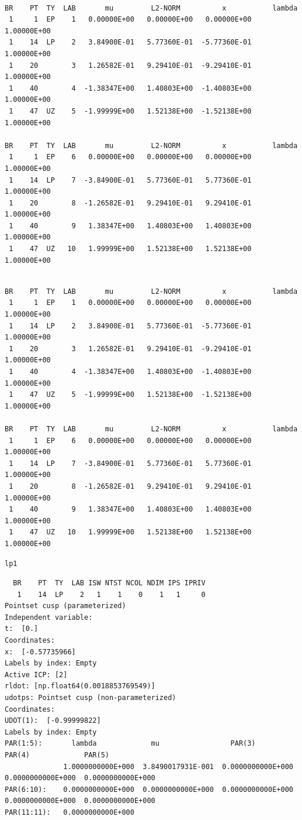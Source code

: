 \documentclass[11pt]{article}
\begin{document}
\begin{verbatim}

BR    PT  TY  LAB       mu         L2-NORM          x           lambda    
 1     1  EP    1   0.00000E+00   0.00000E+00   0.00000E+00   1.00000E+00
 1    14  LP    2   3.84900E-01   5.77360E-01  -5.77360E-01   1.00000E+00
 1    20        3   1.26582E-01   9.29410E-01  -9.29410E-01   1.00000E+00
 1    40        4  -1.38347E+00   1.40803E+00  -1.40803E+00   1.00000E+00
 1    47  UZ    5  -1.99999E+00   1.52138E+00  -1.52138E+00   1.00000E+00

BR    PT  TY  LAB       mu         L2-NORM          x           lambda    
 1     1  EP    6   0.00000E+00   0.00000E+00   0.00000E+00   1.00000E+00
 1    14  LP    7  -3.84900E-01   5.77360E-01   5.77360E-01   1.00000E+00
 1    20        8  -1.26582E-01   9.29410E-01   9.29410E-01   1.00000E+00
 1    40        9   1.38347E+00   1.40803E+00   1.40803E+00   1.00000E+00
 1    47  UZ   10   1.99999E+00   1.52138E+00   1.52138E+00   1.00000E+00
\end{verbatim}


\begin{verbatim}

BR    PT  TY  LAB       mu         L2-NORM          x           lambda    
 1     1  EP    1   0.00000E+00   0.00000E+00   0.00000E+00   1.00000E+00
 1    14  LP    2   3.84900E-01   5.77360E-01  -5.77360E-01   1.00000E+00
 1    20        3   1.26582E-01   9.29410E-01  -9.29410E-01   1.00000E+00
 1    40        4  -1.38347E+00   1.40803E+00  -1.40803E+00   1.00000E+00
 1    47  UZ    5  -1.99999E+00   1.52138E+00  -1.52138E+00   1.00000E+00

BR    PT  TY  LAB       mu         L2-NORM          x           lambda    
 1     1  EP    6   0.00000E+00   0.00000E+00   0.00000E+00   1.00000E+00
 1    14  LP    7  -3.84900E-01   5.77360E-01   5.77360E-01   1.00000E+00
 1    20        8  -1.26582E-01   9.29410E-01   9.29410E-01   1.00000E+00
 1    40        9   1.38347E+00   1.40803E+00   1.40803E+00   1.00000E+00
 1    47  UZ   10   1.99999E+00   1.52138E+00   1.52138E+00   1.00000E+00
\end{verbatim}


\begin{verbatim}
lp1
\end{verbatim}


\begin{verbatim}
  BR    PT  TY  LAB ISW NTST NCOL NDIM IPS IPRIV
   1    14  LP    2   1    1    0    1   1     0
Pointset cusp (parameterized)
Independent variable:
t:  [0.]
Coordinates:
x:  [-0.57735966]
Labels by index: Empty
Active ICP: [2]
rldot: [np.float64(0.0018853769549)]
udotps: Pointset cusp (non-parameterized)
Coordinates:
UDOT(1):  [-0.99999822]
Labels by index: Empty
PAR(1:5):       lambda             mu                 PAR(3)             PAR(4)             PAR(5)         
              1.0000000000E+000  3.8490017931E-001  0.0000000000E+000  0.0000000000E+000  0.0000000000E+000
PAR(6:10):    0.0000000000E+000  0.0000000000E+000  0.0000000000E+000  0.0000000000E+000  0.0000000000E+000
PAR(11:11):   0.0000000000E+000
\end{verbatim}
\end{document}
